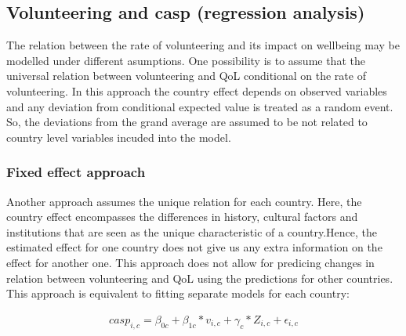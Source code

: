 \documentclass[10pt, letterpaper]{article}
\begin{document}
\begin{spacing}{1.4}

\subsection*{Volunteering and casp (regression analysis)}

The relation between the rate of volunteering and its impact on wellbeing may be modelled under different asumptions. One possibility is to assume that the universal relation between volunteering and QoL conditional on the rate of volunteering. In this approach the country effect depends on observed variables and any deviation from conditional expected value is treated as a random event. So, the deviations from the grand average are assumed to be not related to country level variables incuded into the model. 

\subsubsection*{ Fixed effect approach}

 Another approach assumes the unique relation for each country. Here, the country effect encompasses the differences in history, cultural factors and institutions that are seen as the unique characteristic of a country.Hence, the estimated effect for one country does not give us any extra information on the effect for another one. This approach does not allow for predicing changes in relation between volunteering and QoL using the predictions for other countries. This approach is equivalent to fitting separate models for each country: 

 \begin{eqnarray}
	casp_{i,c}= \beta_{0c}+ \beta_{1c}*v_{i,c} + \gamma_{c}*Z_{i,c} + \epsilon_{i,c}
 \end{eqnarray}


\end{spacing}
\end{document}
